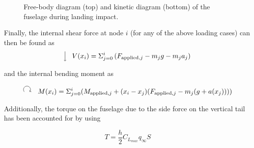 \begin{figure}[H]
    \caption{Free-body diagram (top) and kinetic diagram (bottom) of the fuselage during landing impact.}
    \label{fig:fuselage_fbd_kd_landing}
\end{figure}

Finally, the internal shear force at node $i$ (for any of the above loading cases) can then be found as 
\begin{equation}
    \tikz[baseline=-0.6ex]{\draw[->] (0,0.25) -- (0,-0.25);}
    \quad
    V(x_i)=\Sigma_{j=0}^i \left(F_{\text{applied},j}-m_j g-m_j a_j\right)
\end{equation}

and the internal bending moment as 

\begin{equation}
    \tikz[baseline=-0.6ex]{\draw[->] (0,0) arc (220:-40:0.18)} \quad M(x_i)=\Sigma_{j=0}^i(M_{\text{applied},j}+(x_i-x_j)(F_{\text{applied},j}-m_j(g+a(x_j))))
\end{equation}

Additionally, the torque on the fuselage due to the side force on the vertical tail has been accounted for by using

\begin{equation}
    T=\frac{h}{2}C_{L_{max}}q_{\infty}S
\end{equation}

